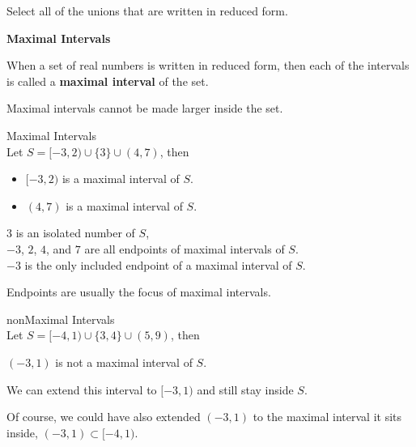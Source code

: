 \documentclass{ximera}
\begin{document}
\begin{question}
Select all of the unions that are written in reduced form.
  \begin{selectAll}
  \choice {$[-3, 4) \cup (2, 7)$}
  \choice {$(-3, 2] \cup [4, 7] \cup \{ 3 \}$}
  \choice [correct]{$[-3, 2) \cup \{ 3 \} \cup (4, 7)$}
  \choice {$(4, 7) \cup [-3, 2)$}
  \end{selectAll}
\end{question}




\begin{definition} \textbf{\textcolor{green!50!black}{Maximal Intervals}}

When a set of real numbers is written in reduced form, then each of the intervals is called a \textbf{maximal interval} of the set.
\end{definition}
Maximal intervals cannot be made larger inside the set.  


\begin{example} Maximal Intervals \\
Let $S = [-3, 2) \cup \{ 3 \} \cup (4, 7)$, then

\begin{itemize}
\item $[-3, 2)$ is a maximal interval of $S$.
\item $(4, 7)$ is a maximal interval of $S$.
\end{itemize}


$3$ is an isolated number of $S$, \\

$-3$, $2$, $4$, and $7$ are all endpoints of maximal intervals of $S$. \\

$-3$ is the only included endpoint of a maximal interval of $S$.



\end{example}
Endpoints are usually the focus of maximal intervals.







\begin{example} nonMaximal Intervals \\
Let $S = [-4, 1) \cup \{ 3, 4 \} \cup (5, 9)$, then


$(-3, 1)$ is not a maximal interval of $S$.

We can extend this interval to $[-3, 1)$ and still stay inside $S$.


\end{example}
Of course, we could have also extended $(-3, 1)$ to the maximal interval it sits inside, $(-3, 1) \subset [-4, 1)$. \\
\end{document}
